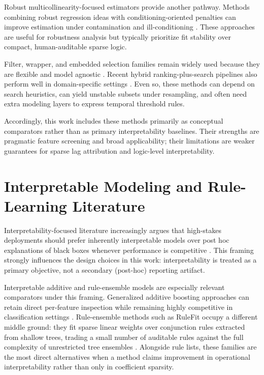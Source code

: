 Robust multicollinearity-focused estimators provide another pathway. Methods combining robust regression ideas with conditioning-oriented penalties can improve estimation under contamination and ill-conditioning \autocite{roozbeh2018}. These approaches are useful for robustness analysis but typically prioritize fit stability over compact, human-auditable sparse logic.

Filter, wrapper, and embedded selection families remain widely used because they are flexible and model agnostic \autocite{ladha2011}. Recent hybrid ranking-plus-search pipelines also perform well in domain-specific settings \autocite{kp2022feature}. Even so, these methods can depend on search heuristics, can yield unstable subsets under resampling, and often need extra modeling layers to express temporal threshold rules.

Accordingly, this work includes these methods primarily as conceptual comparators rather than as primary interpretability baselines. Their strengths are pragmatic feature screening and broad applicability; their limitations are weaker guarantees for sparse lag attribution and logic-level interpretability.

\section{Interpretable Modeling and Rule-Learning Literature}

Interpretability-focused literature increasingly argues that high-stakes deployments should prefer inherently interpretable models over post hoc explanations of black boxes whenever performance is competitive \autocites{CRudin2019Stop,WJMurdoch2019Definitions}. This framing strongly influences the design choices in this work: interpretability is treated as a primary objective, not a secondary (post-hoc) reporting artifact.

Interpretable additive and rule-ensemble models are especially relevant comparators under this framing. Generalized additive boosting approaches can retain direct per-feature inspection while remaining highly competitive in classification settings \autocite{lou2012intelligible}. Rule-ensemble methods such as RuleFit occupy a different middle ground: they fit sparse linear weights over conjunction rules extracted from shallow trees, trading a small number of auditable rules against the full complexity of unrestricted tree ensembles \autocite{friedman2008rulefit}. Alongside rule lists, these families are the most direct alternatives when a method claims improvement in operational interpretability rather than only in coefficient sparsity.

